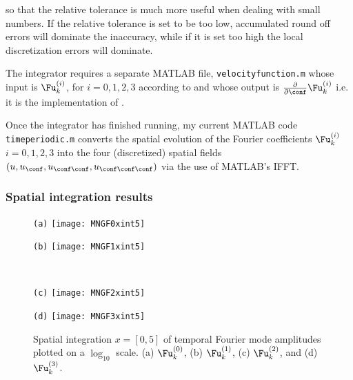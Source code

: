 \begin{itemize}
so that the relative tolerance is much more useful when dealing with small numbers. If the
 relative tolerance is set to be too low, accumulated round off errors will dominate the
 inaccuracy, while if it is set too high the local discretization errors will dominate.

The integrator requires a separate MATLAB file, \texttt{velocityfunction.m} whose
input is $\Fu^{(i)}_{k}$, for $i = 0,1,2,3$ according to  and whose
 output is $\frac{\partial}{\partial \conf}\Fu^{(i)}_{k}$ i.e. it is the implementation of .

Once the integrator has finished running, my current MATLAB code
\\
\texttt{timeperiodic.m} converts the spatial evolution of the Fourier
coefficients $\Fu_k^{(i)}$ $i = 0,1,2,3$ into the four (discretized)
spatial fields $(u,
u_\conf, u_{\conf \conf}, u_{\conf \conf \conf})$ via the use of
MATLAB's IFFT.

\subsubsection{Spatial integration results}

\begin{figure}[h]
  \begin{minipage}[height=.20\textheight]{.48\textwidth}
    \centering \small{\texttt{(a)}}
    \texttt{[image: MNGF0xint5]}
  \end{minipage}
  \begin{minipage}[height=.20\textheight]{.48\textwidth}
    \centering \small{\texttt{(b)}}
    \texttt{[image: MNGF1xint5]}
  \end{minipage}
  \\
  \begin{minipage}[height=.20\textheight]{.48\textwidth}
    \centering \small{\texttt{(c)}}
    \texttt{[image: MNGF2xint5]}
  \end{minipage}
  \centering
  \begin{minipage}[height=.20\textheight]{.48\textwidth}
    \centering \small{\texttt{(d)}}
    \texttt{[image: MNGF3xint5]}
  \end{minipage}
   \caption{
   Spatial integration $x=[0,5]$ of temporal Fourier mode amplitudes plotted on a
   $\log_{10}$ scale. (a) $\Fu^{(0)}_{k}$, (b) $\Fu^{(1)}_{k}$,
   (c) $\Fu^{(2)}_{k}$, and (d) $\Fu^{(3)}_{k}$.
            }
  \label{fig:MNGrfig1}
\end{figure}


\end{itemize}

